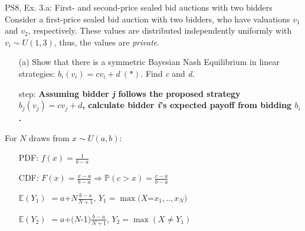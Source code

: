 \begin{frame}{PS8, Ex. 3.a: First- and second-price sealed bid auctions with two bidders}
    Consider a first-price sealed bid auction with two bidders, who have valuations $v_1$ and $v_2$, respectively. These values are distributed independently uniformly with $v_i\sim U(1,3)$, thus, the values are \textit{private}.
    \vspace{-4pt}
    \begin{itemize}
      \item[(a)] Show that there is a symmetric Bayesian Nash Equilibrium in linear strategies: $b_i(v_i) = cv_i + d\ (*)$. Find \textit{c} and \textit{d}.
    \end{itemize}
    \vspace{-8pt}
    \begin{multicols}{2}
      \begin{itemize}
        \item[\nth{1} step:] \textbf{Assuming bidder \textit{j} follows the proposed strategy $b_j(v_j) = cv_j + d$, calculate bidder \textit{i}'s expected payoff from bidding $b_i$.}
      \end{itemize}
      \vfill\null\columnbreak
      For $N$ draws from $x\sim U(a, b):$
      \vspace{-6pt}
      \begin{enumerate}
        \item[PDF:] $f(x)=\frac{1}{b-a}$
        \item[CDF:] $F(x)=\frac{x-a}{b-a}\Rightarrow\mathbb{P}(c>x)=\frac{c-a}{b-a}$
        \item[$\mathbb{E}(Y_1)$] $=a$+$N\frac{b-a}{N+1}$, $Y_1=\max(X$=$x_1,..,x_N)$
        \item[$\mathbb{E}(Y_2)$] $=a$+$(N$-1$)\frac{b-a}{N+1}$, $Y_2=\max(X\neq Y_1)$
      \end{enumerate}
      \vfill\null
    \end{multicols}
\end{frame}
